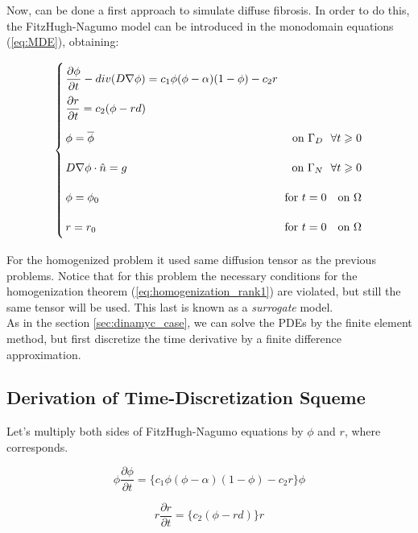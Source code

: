  Now, can be done a first approach to simulate diffuse fibrosis. In order to do this, the FitzHugh-Nagumo model can be introduced in the monodomain equations (\ref{eq:MDE}), obtaining:  

\begin{equation}
\arraycolsep=1.4pt\def\arraystretch{2.2}
\left\lbrace
\begin{array}{lr}
\dfrac{\partial \phi}{ \partial t} - div(D \nabla \phi) = c_1 \phi (\phi - \alpha)(1 - \phi) - c_2 r \\ 
\dfrac{\partial r}{\partial t} = c_2 (\phi - rd)\\
\phi = \overline{\phi} & \text{ on } \Gamma_D ~~ \forall t \geqslant 0 \\
D \nabla \phi \cdot  \hat{n}= g & \text{ on } \Gamma_N ~~ \forall t \geqslant 0 \\
\phi = \phi_0 &\text{ for } t = 0 ~~ \text{ on } \Omega  \\
r = r_0 &\text{ for } t = 0 ~~ \text{ on } \Omega \\
\end{array}
\right.
\end{equation}

For the homogenized problem it used same diffusion tensor as the previous problems. Notice that for this problem the necessary conditions for the homogenization theorem (\ref{eq:homogenization_rank1}) are violated, but still the same tensor will be used. This last is known as a \textsl{surrogate} model. \\

As in the section \ref{sec:dinamyc_case}, we can solve the PDEs by the finite element method, but first discretize the time derivative by a finite difference approximation.

\subsection{Derivation of Time-Discretization Squeme}


 Let's multiply both sides of FitzHugh-Nagumo equations by $\phi$ and $r$, where corresponds.

\begin{equation*}
\phi \dfrac{\partial \phi}{ \partial t}  = \{ c_1 \phi (\phi - \alpha)(1 - \phi) - c_2 r \}\phi
\end{equation*}

\begin{equation*}
r \dfrac{\partial r}{\partial t}  = \{ c_2 (\phi - rd) \} r
\end{equation*}

